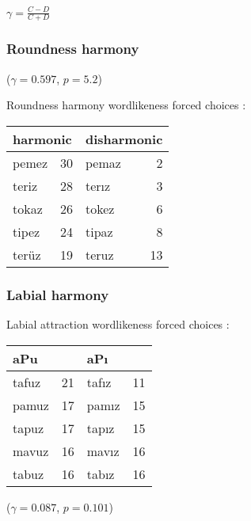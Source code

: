 
\citet{Goodman1954}

\ex $\displaystyle \gamma = \frac{C - D}{C + D}$ \xe

\subsubsection{Roundness harmony}

($\gamma = 0.597$, $p = 5.2$) 

Roundness harmony wordlikeness forced choices \citep[314]{Zimmer1969}: \vspace{6pt} \\ 
\begin{tabular}{l r l r}
\toprule
\multicolumn{2}{l}{harmonic} & \multicolumn{2}{l}{disharmonic} \\
\midrule
pemez & 30                   & pemaz & 2 \\
teriz & 28                   & terız & 3 \\
tokaz & 26                   & tokez & 6 \\
tipez & 24                   & tipaz & 8 \\
terüz & 19                   & teruz & 13 \\
\bottomrule
\end{tabular}

\subsubsection{Labial harmony}

Labial attraction wordlikeness forced choices \citep[314]{Zimmer1969}: \vspace{6pt} \\ 
\begin{tabular}{l r l r}
\toprule
\multicolumn{2}{l}{aPu} & \multicolumn{2}{l}{aPı} \\
\midrule
tafuz & 21              & tafız & 11 \\
pamuz & 17              & pamız & 15 \\
tapuz & 17              & tapız & 15 \\
mavuz & 16              & mavız & 16 \\
tabuz & 16              & tabız & 16 \\
\bottomrule
\end{tabular}

($\gamma = 0.087$, $p = 0.101$)
